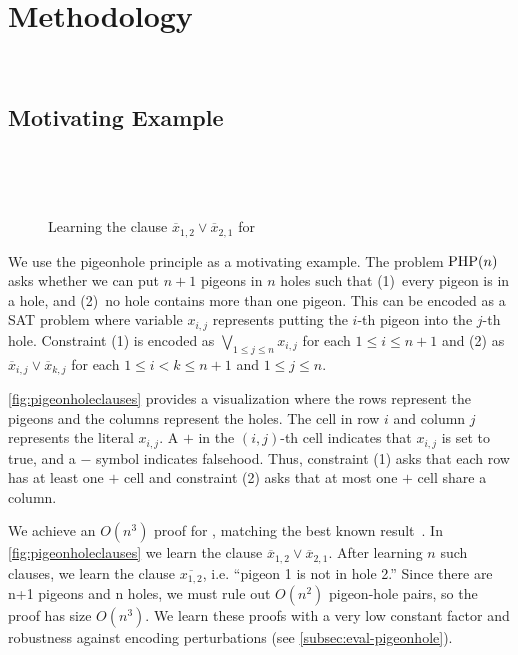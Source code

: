 \section{Methodology}~\label{sec:method}

\subsection{Motivating Example}~\label{sec:motivatex}

\begin{figure*}[!t]
    \centering
    
    \caption{Learning the clause $\overline{x}_{1, 2} \lor \overline{x}_{2, 1}$ for }~\label{fig:pigeonholeclauses}
  \end{figure*}

We use the pigeonhole principle as a motivating example.
The problem $\mathrm{PHP}(n)$ asks whether we can put $n+1$ pigeons in $n$ holes such
that (1)~every pigeon is in a hole, and (2)~no hole contains more than one
pigeon. This can be encoded as a SAT problem where variable $x_{i, j}$
represents putting the $i$-th pigeon into the $j$-th hole. Constraint (1)
is encoded as $\bigvee_{1 \leq j \leq n} x_{i, j}$ for each $1 \leq i \leq n+1$ and
(2) as $\overline{x}_{i, j} \lor \overline{x}_{k, j}$ for each $ 1
\leq i < k \leq n+1$ and $1 \leq j \leq n$.

\autoref{fig:pigeonholeclauses} provides a visualization where the
rows represent the pigeons and the columns represent the holes. The cell in row
$i$ and column $j$ represents the literal $x_{i, j}$.
A $+$ in the $(i, j)$-th cell indicates that $x_{i, j}$ is set to
true, and a $-$ symbol indicates falsehood.
Thus, constraint (1) asks that each row has at least one $+$ cell and
constraint (2) asks that at most one $+$ cell share a column.

We achieve an $O(n^3)$ \pr proof for , matching the best known
result~\cite{prclauses}. In \autoref{fig:pigeonholeclauses} we learn the clause
$\overline{x}_{1, 2} \lor \overline{x}_{2, 1}$. After learning $n$ such clauses,
we learn the clause $\overline{x_{1, 2}}$, i.e. “pigeon 1 is not in hole 2.”
Since there are n+1 pigeons and n holes, we must rule out $O(n^2)$ pigeon-hole
pairs, so the proof has size $O(n^3)$. We learn these proofs with a very low
constant factor and robustness against encoding perturbations (see
\autoref{subsec:eval-pigeonhole}).

